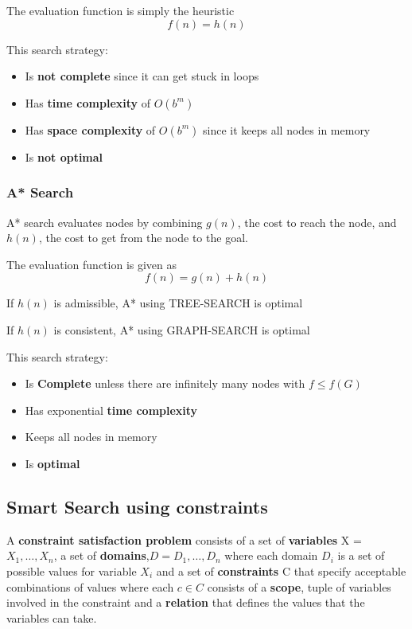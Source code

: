 \documentclass{article}
\begin{document}
The evaluation function is simply the heuristic $$f(n) = h(n)$$

This search strategy:
\begin{itemize}
    \item Is \textbf{not complete} since it can get stuck in loops
    \item Has \textbf{time complexity} of $O(b^m)$ 
    \item Has \textbf{space complexity} of $O(b^m)$ since it keeps all nodes in memory
    \item Is \textbf{not optimal}
\end{itemize}

\subsubsection{A* Search}

A* search evaluates nodes by combining $g(n)$, the cost to reach the node, and $h(n)$, the cost to get from the node to the goal.

The evaluation function is given as $$f(n) = g(n) + h(n)$$

If $h(n)$ is admissible, A* using TREE-SEARCH is optimal

If $h(n)$ is consistent, A* using GRAPH-SEARCH is optimal \newline

This search strategy:
\begin{itemize}
    \item Is \textbf{Complete} unless there are infinitely many nodes with $f \leq f(G)$
    \item Has exponential \textbf{time complexity}
    \item Keeps all nodes in memory
    \item Is \textbf{optimal}
\end{itemize}

\subsection{Smart Search using constraints}

A \textbf{constraint satisfaction problem} consists of a set of \textbf{variables} X = ${X_1,\ldots,X_n}$, a set of \textbf{domains},$D = {D_1,\ldots,D_n}$ where each domain $D_i$ is a set of possible values for variable $X_i$ and a set of \textbf{constraints} C that specify acceptable combinations of values where each $c \in C$ consists of a \textbf{scope}, tuple of variables involved in the constraint and a \textbf{relation} that defines the values that the variables can take.
\end{document}
